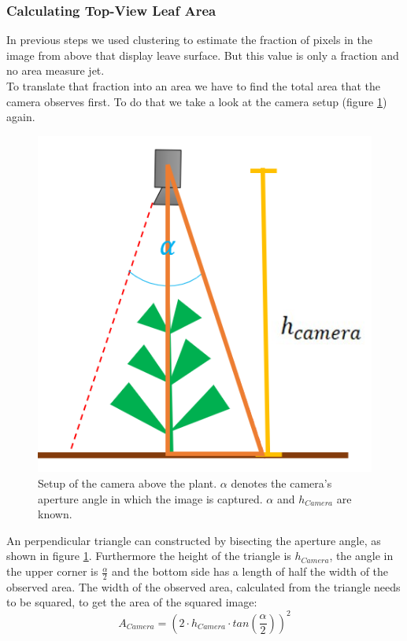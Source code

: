 \graphicspath{{members/tf/figures/}}

\subsubsection{Calculating Top-View Leaf Area}


In previous steps we used clustering to estimate the fraction of pixels in the image from above that display leave surface. But this value is only a fraction and no area measure jet.\\
To translate that fraction into an area we have to find the total area that the camera observes first. To do that we take a look at the camera setup (figure \ref{fig:setupAbove}) again.
   \begin{figure}[H]
       \centering
       \includegraphics[scale=0.6]{setupAbove.PNG}
       \caption{Setup of the camera above the plant. $\alpha$ denotes the camera's aperture angle in which the image is captured. $\alpha$ and $h_{Camera}$ are known.}
       \label{fig:setupAbove}
   \end{figure}
An perpendicular triangle can constructed by bisecting the aperture angle, as shown in figure \ref{fig:setupAbove}.
Furthermore the height of the triangle is $h_{Camera}$, the angle in the upper corner is $\frac{\alpha}{2}$ and the bottom side has a length of half the width of the observed area. The width of the observed area, calculated from the triangle needs to be squared, to get the area of the squared image:
$$A_{Camera} = (2\cdot h_{Camera}\cdot tan(\frac{\alpha}{2}))^2$$

